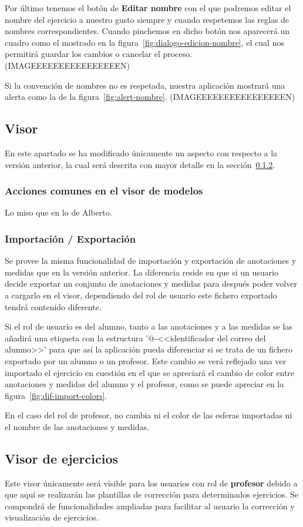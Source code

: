 Por último tenemos el botón de \textbf{Editar nombre} con el que podremos editar el nombre del ejercicio a nuestro gusto siempre y cuando respetemos las reglas de nombres correspondientes. Cuando pinchemos en dicho botón nos aparecerá un cuadro como el mostrado en la figura~\ref{fig:dialogo-edicion-nombre}, el cual nos permitirá guardar los cambios o cancelar el proceso.
(IMAGEEEEEEEEEEEEEEEEN)

Si la convención de nombres no es respetada, nuestra aplicación mostrará una alerta como la de la figura~\ref{fig:alert-nombre}.
(IMAGEEEEEEEEEEEEEEEEN)

\subsection{Visor}
En este apartado se ha modificado únicamente un aspecto con respecto a la versión anterior, la cual será descrita con mayor detalle en la sección~\ref{sec:import-export}.
\subsubsection{Acciones comunes en el visor de modelos}
Lo miso que en lo de Alberto.

\subsubsection{Importación / Exportación}\label{sec:import-export}
Se provee la misma funcionalidad de importación y exportación de anotaciones y medidas que en la versión anterior. La diferencia reside en que si un usuario decide exportar un conjunto de anotaciones y medidas para después poder volver a cargarlo en el visor, dependiendo del rol de usuario este fichero exportado tendrá contenido diferente.

Si el rol de usuario es del alumno, tanto a las anotaciones y a las medidas se las añadirá una etiqueta con la estructura '@-<<identificador del correo del alumno>>' para que así la aplicación pueda diferenciar si se trata de un fichero exportado por un alumno o un profesor. Este cambio se verá reflejado una ver importado el ejercicio en cuestión en el que se apreciará el cambio de color entre anotaciones y medidas del alumno y el profesor, como se puede apreciar en la figura~\ref{fig:dif-import-colors}.

En el caso del rol de profesor, no cambia ni el color de las esferas importadas ni el nombre de las anotaciones y medidas.


\subsection{Visor de ejercicios}\label{sec:visor-ejercicios}
Este visor únicamente será visible para los usuarios con rol de \textbf{profesor} debido a que aquí se realizarán las plantillas de corrección para determinados ejercicios. Se compondrá de funcionalidades ampliadas para facilitar al usuario la corrección y visualización de ejercicios.

